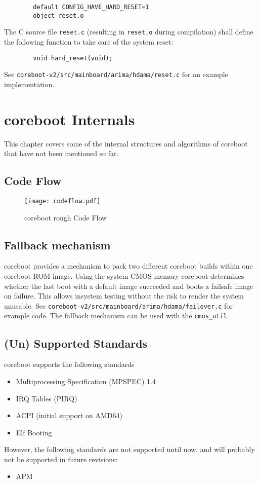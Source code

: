 \documentclass[titlepage,12pt]{article}
\begin{document}
\begin{verbatim}
        default CONFIG_HAVE_HARD_RESET=1
        object reset.o
\end{verbatim}

The C source file \texttt{reset.c} (resulting in \texttt{reset.o}
during compilation) shall define the following function to take care
of the system reset:

\begin{verbatim}
        void hard_reset(void);
\end{verbatim}

See \texttt{coreboot-v2/src/mainboard/arima/hdama/reset.c} for an example
implementation.

\newpage

%
%

\section{coreboot Internals}
This chapter covers some of the internal structures and algorithms of
coreboot that have not been mentioned so far.

\subsection{Code Flow}

\begin{figure}[htb]
\centering
\texttt{[image: codeflow.pdf]}
\caption{coreboot rough Code Flow}
\label{fix:codeflow}
\end{figure}

\newpage

\subsection{Fallback mechanism}
coreboot provides a mechanism to pack two different coreboot builds
within one coreboot ROM image. Using the system CMOS memory coreboot
determines whether the last boot with a default image succeeded and
boots a failsafe image on failure. This allows insystem testing without
the risk to render the system unusable. See
\texttt{coreboot-v2/src/mainboard/arima/hdama/failover.c} for example
code. The fallback mechanism can be used with the \texttt{cmos\_util}.

\subsection{(Un) Supported Standards}
coreboot supports the following standards
\begin{itemize}
\item Multiprocessing Specification (MPSPEC) 1.4
\item IRQ Tables (PIRQ)
\item ACPI (initial support on AMD64)
\item Elf Booting
\end{itemize}
However, the following standards are not supported until now, and will
probably not be supported in future revisions:
\begin{itemize}
\item APM
\end{itemize}
\end{document}

